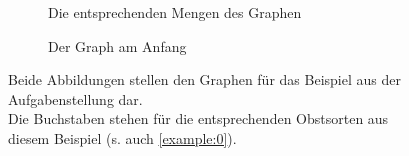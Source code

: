 \begin{figure}[H]
\centering
\begin{subfigure}[b]{.49\textwidth}
\centering

\caption{Die entsprechenden Mengen des Graphen}
\label{fig:graph-anfang}
\end{subfigure}
\begin{subfigure}[b]{.49\textwidth}
\centering

\caption{Der Graph am Anfang}
\label{fig:graph-full}
\end{subfigure}
\caption{Beide Abbildungen stellen den Graphen für das Beispiel aus der Aufgabenstellung dar.\\
Die Buchstaben stehen für die entsprechenden Obstsorten aus diesem Beispiel (s. auch \ref{example:0}).}
\end{figure}
